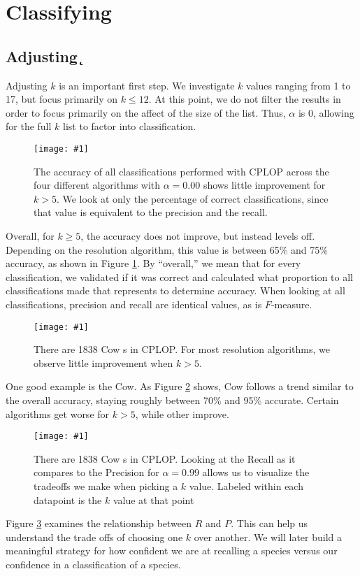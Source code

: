 \section{Classifying}\label{sec:results:classification}
\newcommand{\krapfigurewidth}{\linewidth}
\newcommand{\krapfigure}[1]{\texttt{[image: \#1]}}

\subsection{Adjusting \k{}}
Adjusting $k$ is an important first step. We investigate $k$ values ranging from 1 to 17, but focus primarily on $k \leq 12$. At this point, we do not filter the results in order to focus primarily on the affect of the size of the \knn{} list. Thus, $\alpha$ is 0, allowing for the full $k$ list to factor into classification.

\begin{figure}[t]
\centering
\krapfigure{figures/krap/Overall-ALL-metrics-12-0_000_new}
\caption{The accuracy  of all classifications performed with CPLOP across the four different algorithms with $\alpha=0.00$ shows little improvement for $k>5$. We look at only the percentage of correct classifications, since that value is equivalent to the precision and the recall.}
\label{fig:k_overall}
\end{figure}
Overall, for $k\geq5$, the accuracy does not improve, but instead levels off. Depending on the resolution algorithm, this value is between 65\% and 75\% accuracy, as shown in Figure \ref{fig:k_overall}. By ``overall,'' we mean that for every classification, we validated if it was correct and calculated what proportion to all classifications made that represents to determine accuracy. When looking at all classifications, precision and recall are identical values, as is $F$-measure.


\begin{figure}[t]
\centering
\krapfigure{figures/krap/Cow-ALL-metrics-12-0_000}
\caption{There are 1838 Cow \isol{}s in CPLOP. For most resolution algorithms, we observe little improvement when $k>5$.}
\label{fig:k_cow}
\end{figure}
One good example is the Cow. As Figure \ref{fig:k_cow} shows, Cow follows a trend similar to the overall accuracy, staying roughly between 70\% and 95\% accurate. Certain algorithms get worse for $k>5$, while other improve.

\begin{figure}[t]
\centering
\krapfigure{figures/krap/Cow-ALL-pvr-12-0_000}
\caption{There are 1838 Cow \isol{}s in CPLOP. Looking at the Recall as it compares to the Precision for $\alpha=0.99$ allows us to visualize the tradeoffs we make when picking a $k$ value. Labeled within each datapoint is the $k$ value at that point}
\label{fig:k_cow_pvr}
\end{figure}
Figure \ref{fig:k_cow_pvr} examines the relationship between $R$ and $P$. This can help us understand the trade offs of choosing one $k$ over another. We will later build a meaningful strategy for how confident we are at recalling a species versus our confidence in a classification of a species.


